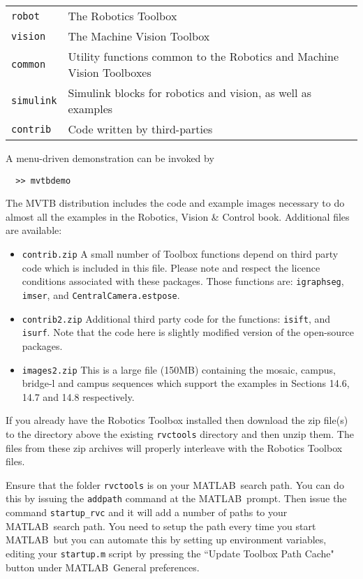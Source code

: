 \documentclass[a4paper,twoside]{report}
\def\Mlab{MATLAB}
\begin{document}
\begin{tabular}{ll}
\texttt{robot} & The Robotics Toolbox \\
\texttt{vision} & The Machine Vision Toolbox\\
\texttt{common} & Utility functions common to the Robotics and Machine Vision Toolboxes\\
\texttt{simulink}  & Simulink blocks for robotics and vision, as well as examples \\
\texttt{contrib} & Code written by third-parties\\
\end{tabular}


A menu-driven demonstration can be invoked by 
\begin{verbatim}
  >> mvtbdemo
\end{verbatim}

The MVTB distribution includes the code and example images necessary to do almost all the examples in the Robotics, Vision \& Control
book.  Additional files are available:
\begin{itemize}
\item \texttt{contrib.zip} A small number of Toolbox functions depend on third party code which is included in this file. Please note and respect the licence conditions associated with these packages.
Those functions are: 
\texttt{igraphseg},
\texttt{imser}, and
\texttt{CentralCamera.estpose}.
\item \texttt{contrib2.zip} Additional third party code for
the functions: \texttt{isift}, and \texttt{isurf}.
Note that the code here is slightly modified version of the open-source
packages.
\item \texttt{images2.zip} This is a large file (150MB) containing the mosaic, campus, bridge-l and campus sequences which support the examples in Sections 14.6, 14.7 and 14.8 respectively.
\end{itemize}

If you already have the Robotics Toolbox installed then download
the zip file(s) to the directory above the existing \texttt{rvctools} directory
and then unzip them.
The files from these zip archives will properly interleave with the Robotics
Toolbox files.

Ensure that the folder \texttt{rvctools} is on your \Mlab\ search
path.  You can do this by issuing the \texttt{addpath} command at 
the \Mlab\ prompt.
Then issue the command \texttt{startup\_rvc} and it will add a number
of paths to your \Mlab\ search path.
You need to setup the path every time you start \Mlab\ but you can 
automate this by setting up environment variables, editing your 
\texttt{startup.m} script by pressing the ``Update Toolbox Path
Cache" button under \Mlab\ General preferences.
\end{document}
